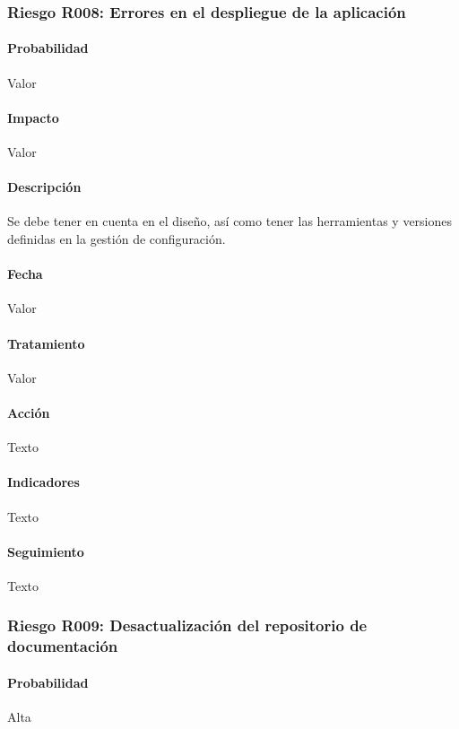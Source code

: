 \documentclass[10pt,a4paper]{article}
\begin{document}
				\subsubsection{Riesgo R008: Errores en el despliegue de la aplicación}
				\paragraph{Probabilidad} Valor
				\paragraph{Impacto}	Valor
				\paragraph{Descripción} Se debe tener en cuenta en el diseño, así como tener las herramientas y versiones definidas en la gestión de configuración.
				\paragraph{Fecha} Valor %
				\paragraph{Tratamiento} Valor %
				\paragraph{Acción} Texto %
				\paragraph{Indicadores} Texto %
				\paragraph{Seguimiento}	Texto %
								
				\subsubsection{Riesgo R009: Desactualización del repositorio de documentación}
				\paragraph{Probabilidad} Alta
\end{document}
